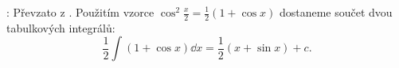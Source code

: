 \begin{mdframed}[style=mdmathsolution]
  [\ref{mai:eq148}]: Převzato z \cite[s.~30]{Knichal}. Použitím vzorce \(\cos^2\frac{x}{2} =
  \frac{1}{2}(1+\cos x)\) dostaneme součet dvou tabulkových integrálů:
  \begin{equation*}
    \frac{1}{2}\int{(1+\cos x)}\dd{x} = \frac{1}{2}(x+\sin x) + c.
  \end{equation*}
\end{mdframed}